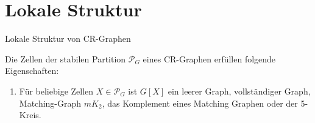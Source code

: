 \documentclass{beamer}
\begin{document}
	\section{Lokale Struktur}
	\begin{frame}{Lokale Struktur von CR-Graphen}
		\begin{Lemma}
			Die Zellen der stabilen Partition $\mathcal{P}_G$ eines CR-Graphen erfüllen folgende Eigenschaften:
			
			\begin{enumerate}[label=(\Alph*)]
				\item Für beliebige Zellen $X\in \mathcal{P}_G$ ist $G[X]$ ein leerer Graph, vollständiger Graph, Matching-Graph $mK_2$, das Komplement eines Matching Graphen oder der 5-Kreis.
			\end{enumerate}
		\end{Lemma}
	\end{frame}
\end{document}
